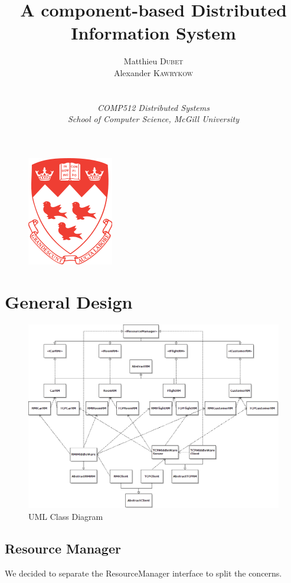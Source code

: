 \documentclass[a4paper]{article}
\title{A component-based Distributed Information System}
\author{
Matthieu \textsc{Dubet} \\
Alexander \textsc{Kawrykow} \\ \\ \\
\emph{COMP512 Distributed Systems} \\
\emph{School of Computer Science, McGill University}
}
\begin{document}
\maketitle
\begin{figure}
  \centering
	\includegraphics[scale=0.8]{mcgill_logo.png}
  \label{mcgill}
\end{figure}
\clearpage
\tableofcontents
\clearpage


\section{General Design}

\begin{figure}
  \centering
	\includegraphics[scale=0.5,angle=90]{classhierarchy.png}
  \caption{UML Class Diagram}
  \label{uml}
\end{figure}

\subsection{Resource Manager}
We decided to separate the ResourceManager interface to split the concerns. 
\end{document}
